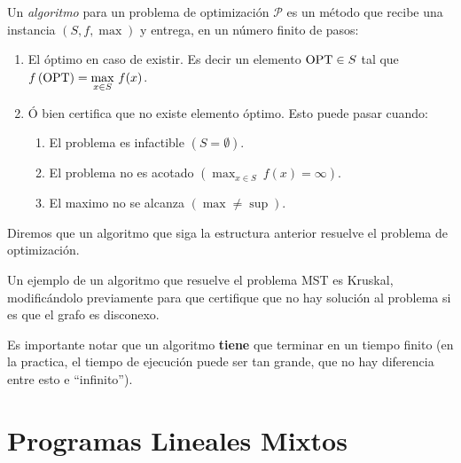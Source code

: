 \begin{defi}[Algoritmo] Un \emph{algoritmo} para un problema de optimización $\mathcal{P}$  es un método que recibe una instancia $(S,f,\max)$ y entrega, en un número finito de pasos:
\begin{enumerate}
    \item El óptimo en caso de existir. Es decir un elemento $\mathrm{OPT} \in S$ tal que $f\left(\mathrm{OPT}\right)= \displaystyle{\max_{x\in S}}~f(x)$.
    \item Ó bien certifica que no existe elemento óptimo. Esto puede pasar cuando:
        \begin{enumerate}
            \item El problema es infactible $\left(S=\emptyset\right)$.
            \item El problema no es acotado $\left(\displaystyle{\max_{x \in S}}~f(x)= \infty\right)$.
            \item El maximo no se alcanza $\left(\max \neq \sup\right)$.
        \end{enumerate}
\end{enumerate}
\end{defi}

Diremos que un algoritmo que siga la estructura anterior resuelve el problema de optimización.

\begin{eje}
Un ejemplo de un algoritmo que resuelve el problema MST es Kruskal, modificándolo previamente  para que certifique que no hay solución al problema si es que el grafo es disconexo.
\end{eje}

Es importante notar que un algoritmo \textbf{tiene} que terminar en un tiempo finito (en la practica, el tiempo de ejecución puede ser tan grande, que no hay diferencia entre esto e ``infinito'').

\newpage

\section{Programas Lineales Mixtos}

